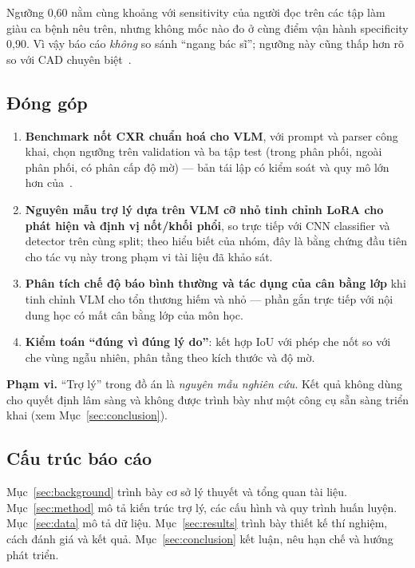 Ngưỡng 0,60 nằm cùng khoảng với sensitivity của người đọc trên các tập làm giàu ca bệnh nêu trên, nhưng không
mốc nào đo ở cùng điểm vận hành specificity 0,90. Vì vậy báo cáo \emph{không} so sánh ``ngang bác sĩ''; ngưỡng
này cũng thấp hơn rõ so với CAD chuyên biệt~\cite{vanleeuwen2024commercial,lee2020dl}.

\subsection{Đóng góp}

\begin{enumerate}
  \item \textbf{Benchmark nốt CXR chuẩn hoá cho VLM}, với prompt và parser công khai, chọn ngưỡng trên
        validation và ba tập test (trong phân phối, ngoài phân phối, có phân cấp độ mờ) --- bản tái lập có kiểm
        soát và quy mô lớn hơn của~\cite{khovanova2026comparative,nishio2026zeroshot}.
  \item \textbf{Nguyên mẫu trợ lý dựa trên VLM cỡ nhỏ tinh chỉnh LoRA cho phát hiện và định vị nốt/khối phổi},
        so trực tiếp với CNN classifier và detector trên cùng split; theo hiểu biết của nhóm, đây là bằng chứng
        đầu tiên cho tác vụ này trong phạm vi tài liệu đã khảo sát.
  \item \textbf{Phân tích chế độ báo bình thường và tác dụng của cân bằng lớp} khi tinh chỉnh VLM cho tổn
        thương hiếm và nhỏ --- phần gắn trực tiếp với nội dung học có mất cân bằng lớp của môn học.
  \item \textbf{Kiểm toán ``đúng vì đúng lý do''}: kết hợp IoU với phép che nốt so với che vùng ngẫu nhiên,
        phân tầng theo kích thước và độ mờ.
\end{enumerate}

\begin{warnbox}
\textbf{Phạm vi.} ``Trợ lý'' trong đồ án là \emph{nguyên mẫu nghiên cứu}. Kết quả không dùng cho quyết định
lâm sàng và không được trình bày như một công cụ sẵn sàng triển khai (xem Mục~\ref{sec:conclusion}).
\end{warnbox}

\subsection{Cấu trúc báo cáo}

Mục~\ref{sec:background} trình bày cơ sở lý thuyết và tổng quan tài liệu. Mục~\ref{sec:method} mô tả kiến trúc
trợ lý, các cấu hình và quy trình huấn luyện. Mục~\ref{sec:data} mô tả dữ liệu. Mục~\ref{sec:results} trình
bày thiết kế thí nghiệm, cách đánh giá và kết quả. Mục~\ref{sec:conclusion} kết luận, nêu hạn chế và hướng
phát triển.
